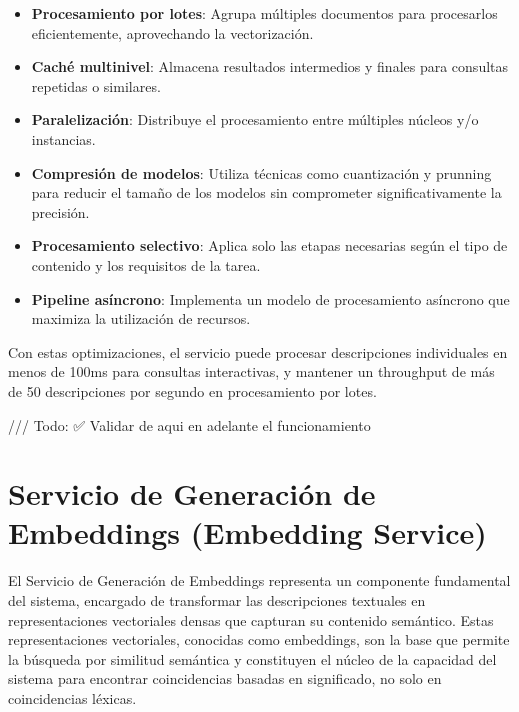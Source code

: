 \documentclass[12pt,a4paper]{article}
\begin{document}
\begin{itemize}
    \item \textbf{Procesamiento por lotes}: Agrupa múltiples documentos para procesarlos eficientemente, aprovechando la vectorización.
    
    \item \textbf{Caché multinivel}: Almacena resultados intermedios y finales para consultas repetidas o similares.
    
    \item \textbf{Paralelización}: Distribuye el procesamiento entre múltiples núcleos y/o instancias.
    
    \item \textbf{Compresión de modelos}: Utiliza técnicas como cuantización y prunning para reducir el tamaño de los modelos sin comprometer significativamente la precisión.
    
    \item \textbf{Procesamiento selectivo}: Aplica solo las etapas necesarias según el tipo de contenido y los requisitos de la tarea.
    
    \item \textbf{Pipeline asíncrono}: Implementa un modelo de procesamiento asíncrono que maximiza la utilización de recursos.
\end{itemize}

Con estas optimizaciones, el servicio puede procesar descripciones individuales en menos de 100ms para consultas interactivas, y mantener un throughput de más de 50 descripciones por segundo en procesamiento por lotes.



/// Todo: ✅ Validar de aqui en adelante el funcionamiento 


\section{Servicio de Generación de Embeddings (Embedding Service)}
\label{sec:embedding-service}

El Servicio de Generación de Embeddings representa un componente fundamental del sistema, encargado de transformar las descripciones textuales en representaciones vectoriales densas que capturan su contenido semántico. Estas representaciones vectoriales, conocidas como embeddings, son la base que permite la búsqueda por similitud semántica y constituyen el núcleo de la capacidad del sistema para encontrar coincidencias basadas en significado, no solo en coincidencias léxicas.
\end{document}
